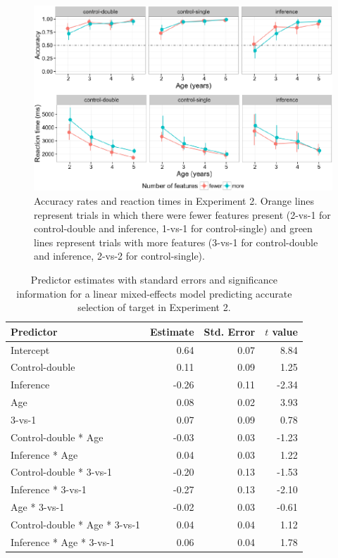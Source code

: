\documentclass[a4paper,man,apacite,floatsintext]{apa6}
\newenvironment{CodeChunk}{}{}
\begin{document}
\begin{CodeChunk}
\begin{figure}[H]

{\centering \includegraphics{figs/ipaccrt-1} 

}

\caption[Accuracy rates and reaction times in Experiment 2]{Accuracy rates and reaction times in Experiment 2. Orange lines represent trials in which there were fewer features present (2-vs-1 for control-double and inference, 1-vs-1 for control-single) and green lines represent trials with more features (3-vs-1 for control-double and inference, 2-vs-2 for control-single).}\label{fig:ipaccrt}
\end{figure}
\end{CodeChunk}

\begin{table}[tb]
\centering
\begin{tabular}{lrrr}
 Predictor & Estimate & Std. Error & $t$ value \\ 
  \hline
Intercept & 0.64 & 0.07 & 8.84 \\ 
  Control-double & 0.11 & 0.09 & 1.25 \\ 
  Inference & -0.26 & 0.11 & -2.34 \\ 
  Age & 0.08 & 0.02 & 3.93 \\ 
  3-vs-1 & 0.07 & 0.09 & 0.78 \\ 
  Control-double * Age & -0.03 & 0.03 & -1.23 \\ 
  Inference * Age & 0.04 & 0.03 & 1.22 \\ 
  Control-double * 3-vs-1 & -0.20 & 0.13 & -1.53 \\ 
  Inference * 3-vs-1 & -0.27 & 0.13 & -2.10 \\ 
  Age * 3-vs-1 & -0.02 & 0.03 & -0.61 \\ 
  Control-double * Age * 3-vs-1 & 0.04 & 0.04 & 1.12 \\ 
  Inference * Age * 3-vs-1 & 0.06 & 0.04 & 1.78 \\ 
   \hline
\end{tabular}
\caption{Predictor estimates with standard errors and significance information for a linear mixed-effects model predicting accurate selection of target in Experiment 2.} 
\label{tab:exp3_tab}
\end{table}
\end{document}
